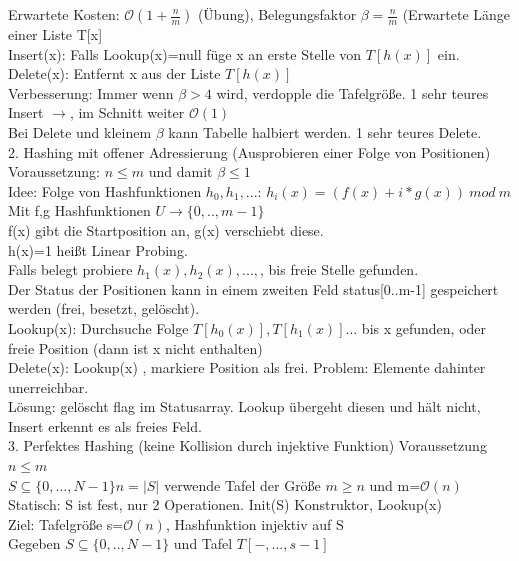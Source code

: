 \documentclass[a4paper]{article}
\newcommand{\oh}[1]{$\mathcal{O}(#1)$}
\begin{document}
\hspace*{1cm} Erwartete Kosten: \oh{1+\frac{n}{m}} (Übung), Belegungsfaktor $\beta = \frac{n}{m}$ (Erwartete Länge einer Liste T[x]\\
Insert(x): Falls Lookup(x)=null füge x an erste Stelle von $T[h(x)]$ ein. \\
Delete(x): Entfernt x aus der Liste $T[h(x)]$\\
Verbesserung: Immer wenn $\beta >4 $ wird, verdopple die Tafelgröße. 1 sehr teures Insert $\rightarrow$, im Schnitt weiter \oh{1}\\
Bei Delete und kleinem $\beta$ kann Tabelle halbiert werden. 1 sehr teures Delete.\\
2. Hashing mit offener Adressierung (Ausprobieren einer Folge von Positionen)\\
Voraussetzung: $n\leq m$ und damit $\beta \leq 1$\\
Idee: Folge von Hashfunktionen $h_0, h_1,...$: $h_i(x) = (f(x) + i * g(x))\ mod\ m$\\
Mit f,g Hashfunktionen $U\rightarrow \{0,..,m-1\}$\\
f(x) gibt die Startposition an, g(x) verschiebt diese.\\
h(x)=1 heißt Linear Probing.\\
Falls belegt probiere $h_1(x), h_2(x),...,$, bis freie Stelle gefunden.\\
Der Status der Positionen kann in einem zweiten Feld status[0..m-1] gespeichert werden (frei, besetzt, gelöscht).\\
Lookup(x): Durchsuche Folge $T[h_0(x)],T[h_1(x)]...$ bis x gefunden, oder freie Position (dann ist x nicht enthalten)\\
Delete(x): Lookup(x) , markiere Position als frei. Problem: Elemente dahinter unerreichbar.\\
\hspace*{1cm}  Lösung: gelöscht flag im Statusarray. Lookup übergeht diesen und hält nicht, Insert erkennt es als freies Feld.\\
3. Perfektes Hashing (keine Kollision durch injektive Funktion) Voraussetzung $n\leq m$\\
$S\subseteq \{0,...,N-1\} n=|S|$ verwende Tafel der Größe $m\geq n$ und m=\oh{n}\\
Statisch: S ist fest, nur 2 Operationen. Init(S) Konstruktor, Lookup(x)\\
Ziel: Tafelgröße s=\oh{n}, Hashfunktion injektiv auf S\\
Gegeben $S\subseteq \{0,..,N-1\}$ und Tafel $T[-,...,s-1]$\\
\end{document}
